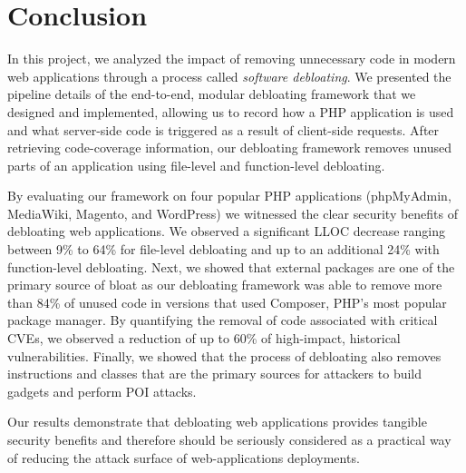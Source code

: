 \section{Conclusion}
In this project, we analyzed the impact of removing unnecessary code in modern
web applications through a process called \textit{software debloating}.
We presented the pipeline details of the end-to-end, modular debloating
framework that we designed and implemented, allowing us to record how a
PHP application is used and what server-side code is triggered as a result of
client-side requests. After retrieving code-coverage information, our debloating
framework removes unused parts of
an application using file-level and function-level debloating.

By evaluating
our framework on four popular PHP applications (phpMyAdmin, MediaWiki,
Magento, and WordPress) we witnessed the clear security benefits of debloating web
applications. We observed a significant LLOC decrease ranging between
9\% to 64\% for file-level debloating and up to an additional 24\% with
function-level debloating. Next, we showed that external packages are one
of the primary source of bloat as our debloating framework was able to remove
more than 84\% of unused code in versions that used Composer, PHP's most popular
package manager. By quantifying the removal of code associated with critical
CVEs, we observed a reduction of up to 60\% of high-impact, historical vulnerabilities.
Finally, we showed that the process of debloating also removes
instructions and classes that are the primary sources for attackers to build
gadgets and perform POI attacks.

Our results demonstrate that debloating web applications
provides tangible security benefits and therefore should be seriously
considered as a practical way of reducing the attack surface of
web-applications deployments.
